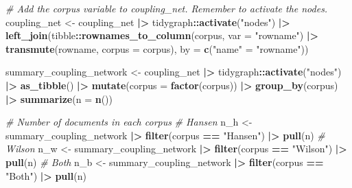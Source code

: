 \documentclass[
11pt, %
oneside, %
english, %
singlespacing, %
]{macthesis} %
\newenvironment{Shaded}{\begin{snugshade}}{\end{snugshade}}
\newcommand{\AttributeTok}[1]{\textcolor[rgb]{0.13,0.29,0.53}{#1}}
\newcommand{\CommentTok}[1]{\textcolor[rgb]{0.56,0.35,0.01}{\textit{#1}}}
\newcommand{\FunctionTok}[1]{\textcolor[rgb]{0.13,0.29,0.53}{\textbf{#1}}}
\newcommand{\NormalTok}[1]{#1}
\newcommand{\OtherTok}[1]{\textcolor[rgb]{0.56,0.35,0.01}{#1}}
\newcommand{\SpecialCharTok}[1]{\textcolor[rgb]{0.81,0.36,0.00}{\textbf{#1}}}
\newcommand{\StringTok}[1]{\textcolor[rgb]{0.31,0.60,0.02}{#1}}
\begin{document}
\begin{Shaded}
\begin{Highlighting}[]
\CommentTok{\# Add the \textasciigrave{}corpus\textasciigrave{} variable to \textasciigrave{}coupling\_net\textasciigrave{}. Remember to activate the nodes.}
\NormalTok{coupling\_net }\OtherTok{\textless{}{-}}\NormalTok{ coupling\_net }\SpecialCharTok{|\textgreater{}}
\NormalTok{  tidygraph}\SpecialCharTok{::}\FunctionTok{activate}\NormalTok{(}\StringTok{"nodes"}\NormalTok{) }\SpecialCharTok{|\textgreater{}}
  \FunctionTok{left\_join}\NormalTok{(tibble}\SpecialCharTok{::}\FunctionTok{rownames\_to\_column}\NormalTok{(corpus, }
                                       \AttributeTok{var =} \StringTok{"rowname"}\NormalTok{) }\SpecialCharTok{|\textgreater{}} 
              \FunctionTok{transmute}\NormalTok{(rowname, }
                        \AttributeTok{corpus =}\NormalTok{ corpus),}
            \AttributeTok{by =} \FunctionTok{c}\NormalTok{(}\StringTok{"name"} \OtherTok{=} \StringTok{"rowname"}\NormalTok{))}
\end{Highlighting}
\end{Shaded}

\begin{Shaded}
\begin{Highlighting}[]
\NormalTok{summary\_coupling\_network }\OtherTok{\textless{}{-}}\NormalTok{ coupling\_net }\SpecialCharTok{|\textgreater{}}
\NormalTok{  tidygraph}\SpecialCharTok{::}\FunctionTok{activate}\NormalTok{(}\StringTok{"nodes"}\NormalTok{) }\SpecialCharTok{|\textgreater{}}
  \FunctionTok{as\_tibble}\NormalTok{() }\SpecialCharTok{|\textgreater{}}
  \FunctionTok{mutate}\NormalTok{(}\AttributeTok{corpus =} \FunctionTok{factor}\NormalTok{(corpus)) }\SpecialCharTok{|\textgreater{}}
  \FunctionTok{group\_by}\NormalTok{(corpus) }\SpecialCharTok{|\textgreater{}}
  \FunctionTok{summarize}\NormalTok{(}\AttributeTok{n =} \FunctionTok{n}\NormalTok{())}

\CommentTok{\# Number of documents in each corpus}
\CommentTok{\# Hansen}
\NormalTok{n\_h }\OtherTok{\textless{}{-}}\NormalTok{ summary\_coupling\_network }\SpecialCharTok{|\textgreater{}} 
  \FunctionTok{filter}\NormalTok{(corpus }\SpecialCharTok{==} \StringTok{"Hansen"}\NormalTok{) }\SpecialCharTok{|\textgreater{}} 
  \FunctionTok{pull}\NormalTok{(n)}
\CommentTok{\# Wilson}
\NormalTok{n\_w }\OtherTok{\textless{}{-}}\NormalTok{ summary\_coupling\_network }\SpecialCharTok{|\textgreater{}} 
  \FunctionTok{filter}\NormalTok{(corpus }\SpecialCharTok{==} \StringTok{"Wilson"}\NormalTok{) }\SpecialCharTok{|\textgreater{}} 
  \FunctionTok{pull}\NormalTok{(n)}
\CommentTok{\# Both}
\NormalTok{n\_b }\OtherTok{\textless{}{-}}\NormalTok{ summary\_coupling\_network }\SpecialCharTok{|\textgreater{}} 
  \FunctionTok{filter}\NormalTok{(corpus }\SpecialCharTok{==} \StringTok{"Both"}\NormalTok{) }\SpecialCharTok{|\textgreater{}} 
  \FunctionTok{pull}\NormalTok{(n)}
\end{Highlighting}
\end{Shaded}
\end{document}
